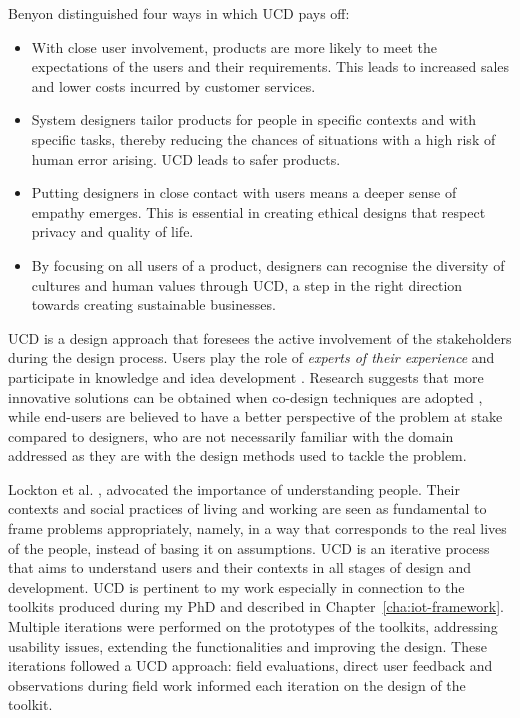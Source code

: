 Benyon \autocite*{benyon_designing_2014} distinguished four ways in which UCD pays off:
\begin{itemize}
    \item With close user involvement, products are more likely to meet the expectations of the users and their requirements. This leads to increased sales and lower costs incurred by customer services.
    \item System designers tailor products for people in specific contexts and with specific tasks, thereby reducing the chances of situations with a high risk of human error arising. UCD leads to safer products.
    \item Putting designers in close contact with users means a deeper sense of empathy emerges. This is essential in creating ethical designs that respect privacy and quality of life.
    \item By focusing on all users of a product, designers can recognise the diversity of cultures and human values through UCD, a step in the right direction towards creating sustainable businesses.
\end{itemize}

UCD is a design approach that foresees the active involvement of the stakeholders during the design process. Users play the role of \textit{experts of their experience} and participate in knowledge and idea development \autocite{sanders_co-creation_2008}. Research suggests that more innovative solutions can be obtained when co-design techniques are adopted \autocite{trischler_value_2018}, while end-users are believed to have a better perspective of the problem at stake compared to designers, who are not necessarily familiar with the domain addressed as they are with the design methods used to tackle the problem.

Lockton et al. \autocite*{lockton_designing_2014}, advocated the importance of understanding people. Their contexts and social practices of living and working are seen as fundamental to frame problems appropriately, namely, in a way that corresponds to the real lives of the people, instead of basing it on assumptions.
UCD is an iterative process that aims to understand users and their contexts in all stages of design and development. UCD is pertinent to my work especially in connection to the toolkits produced during my PhD and described in Chapter~\ref{cha:iot-framework}. Multiple iterations were performed on the prototypes of the toolkits, addressing usability issues, extending the functionalities and improving the design. These iterations followed a UCD approach: field evaluations, direct user feedback and observations during field work informed each iteration on the design of the toolkit.

